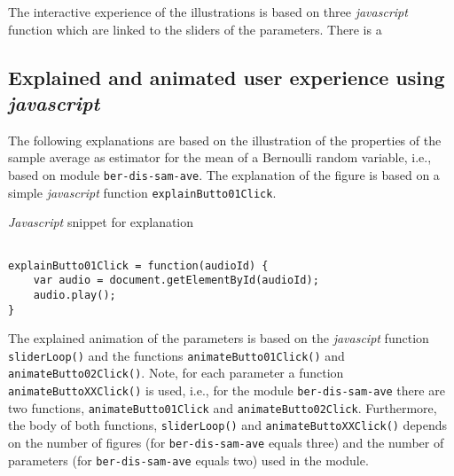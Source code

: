 \documentclass[12pt]{article}
\begin{document}
 





The interactive experience of the illustrations is based on three \emph{javascript} function which are linked to the sliders of the parameters. 
%
There is a 



\subsection{Explained and animated user experience using \emph{javascript}}

The following explanations are based on the illustration of the properties of the sample average as estimator for the mean of a Bernoulli random variable, i.e., based on module \texttt{ber-dis-sam-ave}. 
%
The explanation of the figure is based on a simple \emph{javascript} function \texttt{explainButto01Click}.

\begin{CodeSnippet}[!hp]
	\centering
	\caption{\emph{Javascript} snippet for explanation}
\vspace{0.25cm}
	\begin{BVerbatim}

explainButto01Click = function(audioId) {
	var audio = document.getElementById(audioId);
	audio.play();
}

	\end{BVerbatim}
	\vspace*{-2mm}
	\label{JsCodSniExp}
\end{CodeSnippet}

The explained animation of the parameters is based on the \emph{javascipt} function \texttt{sliderLoop()} and the functions \texttt{animateButto01Click()} and \texttt{animateButto02Click()}. 
%
Note, for each parameter a function \texttt{animateButtoXXClick()} is used, i.e., for the module \texttt{ber-dis-sam-ave} there are two functions, \texttt{animateButto01Click} and \texttt{animateButto02Click}. 
%
%
Furthermore, the body of both functions, \texttt{sliderLoop()} and \texttt{animateButtoXXClick()} depends on the number of figures (for \texttt{ber-dis-sam-ave} equals three) and the number of parameters (for \texttt{ber-dis-sam-ave} equals two) used in the module.
\end{document}
